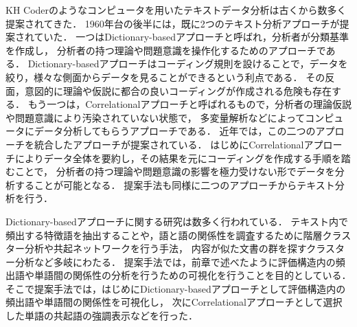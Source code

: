 \documentclass[syuuron]{kuee}
\begin{document}
		KH Coderのようなコンピュータを用いたテキストデータ分析は古くから数多く提案されてきた．
		1960年台の後半には，既に2つのテキスト分析アプローチが提案されていた．
		一つはDictionary-basedアプローチと呼ばれ，分析者が分類基準を作成し，
		分析者の持つ理論や問題意識を操作化するためのアプローチである\cite{kh3}．
		Dictionary-basedアプローチはコーディング規則を設けることで，データを絞り，様々な側面からデータを見ることができるという利点である．
		その反面，意図的に理論や仮説に都合の良いコーディングが作成される危険も存在する．
		もう一つは，Correlationalアプローチと呼ばれるもので，分析者の理論仮説や問題意識により汚染されていない状態で，
		多変量解析などによってコンピュータにデータ分析してもらうアプローチである．
		近年では，この二つのアプローチを統合したアプローチが提案されている\cite{kh1, kh2}．
		はじめにCorrelationalアプローチによりデータ全体を要約し，その結果を元にコーディングを作成する手順を踏むことで，
		分析者の持つ理論や問題意識の影響を極力受けない形でデータを分析することが可能となる．
		提案手法も同様に二つのアプローチからテキスト分析を行う．
		
		Dictionary-basedアプローチに関する研究は数多く行われている．
		テキスト内で頻出する特徴語を抽出することや，語と語の関係性を調査するために階層クラスター分析や共起ネットワークを行う手法，
		内容が似た文書の群を探すクラスター分析など多岐にわたる．
		提案手法では，前章で述べたように評価構造内の頻出語や単語間の関係性の分析を行うための可視化を行うことを目的としている．
		そこで提案手法では，はじめにDictionary-basedアプローチとして評価構造内の頻出語や単語間の関係性を可視化し，
		次にCorrelationalアプローチとして選択した単語の共起語の強調表示などを行った．
		
\end{document}
